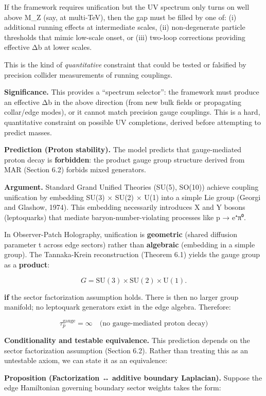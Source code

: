 \documentclass[
]{article}
\begin{document}
If the framework requires unification but the UV spectrum only turns on
well above M\_Z (say, at multi-TeV), then the gap must be filled by one
of: (i) additional running effects at intermediate scales, (ii)
non-degenerate particle thresholds that mimic low-scale onset, or (iii)
two-loop corrections providing effective Δb at lower scales.

This is the kind of \emph{quantitative} constraint that could be tested
or falsified by precision collider measurements of running couplings.

\textbf{Significance.} This provides a ``spectrum selector'': the
framework must produce an effective Δb in the above direction (from new
bulk fields or propagating collar/edge modes), or it cannot match
precision gauge couplings. This is a hard, quantitative constraint on
possible UV completions, derived before attempting to predict masses.

\textbf{Prediction (Proton stability).} The model predicts that
gauge-mediated proton decay is \textbf{forbidden}: the product gauge
group structure derived from MAR (Section 6.2) forbids mixed generators.

\textbf{Argument.} Standard Grand Unified Theories (SU(5), SO(10))
achieve coupling unification by embedding SU(3) × SU(2) × U(1) into a
simple Lie group (Georgi and Glashow, 1974). This embedding necessarily
introduces X and Y bosons (leptoquarks) that mediate
baryon-number-violating processes like p → e⁺π⁰.

In Observer-Patch Holography, unification is \textbf{geometric} (shared
diffusion parameter t across edge sectors) rather than
\textbf{algebraic} (embedding in a simple group). The Tannaka-Krein
reconstruction (Theorem 6.1) yields the gauge group as a
\textbf{product}:

\[
G = \mathrm{SU}(3) \times \mathrm{SU}(2) \times \mathrm{U}(1).
\]

\textbf{if} the sector factorization assumption holds. There is then no
larger group manifold; no leptoquark generators exist in the edge
algebra. Therefore:

\[
\tau_p^{\mathrm{gauge}} = \infty \quad \text{(no gauge-mediated proton decay)}
\]

\textbf{Conditionality and testable equivalence.} This prediction
depends on the sector factorization assumption (Section 6.2). Rather
than treating this as an untestable axiom, we can state it as an
equivalence:

\textbf{Proposition (Factorization ↔ additive boundary Laplacian).}
Suppose the edge Hamiltonian governing boundary sector weights takes the
form:
\end{document}
